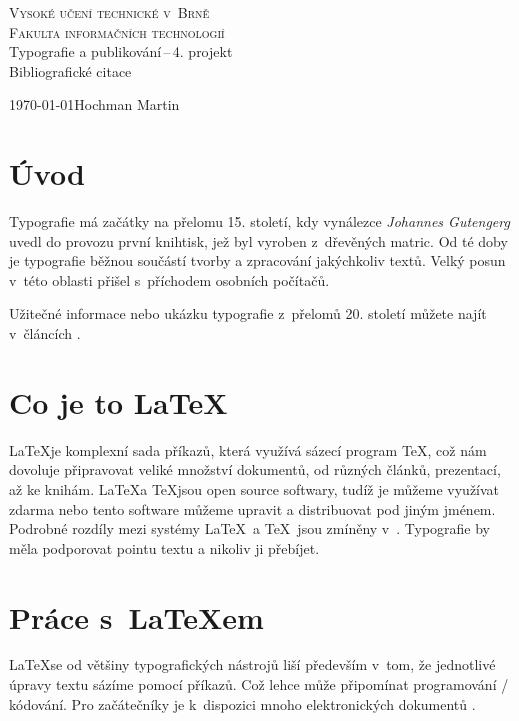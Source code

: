 \documentclass[11pt,a4paper]{article}
\begin{document}
\begin{titlepage}
\begin{center}
    \Huge{\textsc{Vysoké učení technické v~Brně \\}}
    \huge{\textsc{Fakulta informačních technologií \\}}
    \LARGE{Typografie a publikování\,--\,4. projekt\\}
    \Huge{Bibliografické citace}
\end{center}
{\Large \today \hfill Hochman Martin}
\end{titlepage}

\section*{Úvod}
Typografie má začátky na přelomu 15. století, kdy vynálezce \textit{Johannes Gutengerg} uvedl do provozu první knihtisk, jež byl vyroben z~dřevěných matric. Od té doby je typografie běžnou součástí tvorby a zpracování jakýchkoliv textů. Velký posun v~této oblasti přišel s~příchodem osobních počítačů.\cite{Rybicka}

Užitečné informace nebo ukázku typografie z~přelomů 20. století můžete najít v~článcích \cite{Typografia-1} \cite{Typografia-2}.

\section*{Co je to \LaTeX}
\LaTeX je komplexní sada příkazů, která využívá sázecí program \TeX, což nám dovoluje připravovat veliké množství dokumentů, od různých článků, prezentací, až ke knihám. \LaTeX a \TeX jsou open source softwary, tudíž je můžeme využívat zdarma nebo tento software můžeme upravit a distribuovat pod jiným jménem. Podrobné rozdíly mezi systémy \LaTeX\ a \TeX\ jsou zmíněny v~\cite{Kopkac}.
Typografie by měla podporovat pointu textu a nikoliv ji přebíjet. \cite{Butterick}

\section*{Práce s~\LaTeX em}
\LaTeX se od většiny typografických nástrojů liší především v~tom, že jednotlivé úpravy textu sázíme pomocí příkazů. Což lehce může připomínat programování / kódování. Pro začátečníky je k~dispozici mnoho elektronických dokumentů \cite{Brabec} \cite{Overleaf}.
\end{document}
